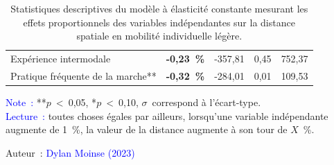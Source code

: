 \begin{table}[h!]
{\begin{tabular}{p{}p{}p{}p{}p{}}
\small{Expérience intermodale} & \small{\textbf{-0,23~\%}} & \small{-357,81} & \small{0,45} & \small{752,37}\\
\small{Pratique fréquente de la marche**} & \small{\textbf{-0,32~\%}} & \small{-284,01} & \small{0,01} & \small{109,53}\\
        \hline
        \end{tabular}}
    \caption{Statistiques descriptives du modèle à élasticité constante mesurant les effets proportionnels des variables indépendantes sur la distance spatiale en mobilité individuelle légère.}
    \label{table-chap5:facteurs-distance-spatiale}
        \vspace{5pt}
        \begin{flushleft}\scriptsize{
        \textcolor{blue}{Note~:} **$p$~\textless~0,05, *$p$~\textless~0,10, $\sigma$~correspond à l'écart-type.
        \\
        \textcolor{blue}{Lecture~:} toutes choses égales par ailleurs, lorsqu'une variable indépendante augmente de 1~\%, la valeur de la distance augmente à son tour de $X$~\%.
        }\end{flushleft}
        \begin{flushright}\scriptsize
        Auteur~: \textcolor{blue}{Dylan Moinse (2023)}
        \end{flushright}
        \end{table}